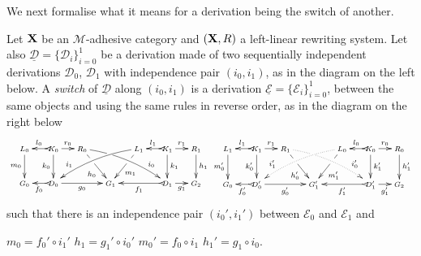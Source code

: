 \documentclass[a4paper,UKenglish,cleveref,pdftex,thm-restate,numberwithinsect]{lipics-v2021}
\def\R{\mathsf{R}}
\def\X{\textbf {\textup{X}}}
\newcommand{\dder}[1]{\mathscr{#1}}
\newcommand{\der}[1]{\underline{\dder{#1}}}
\begin{document}
We next formalise what it means for a derivation being the switch of another.


\begin{definition}[Switch]
  \label{def:switch}
  Let $\X$ be an $\mathcal{M}$-adhesive category 
  and $(\X, \R)$ a left-linear rewriting system. 
  Let also
  $\der{D}=\{\dder{D}_i\}_{i=0}^1$ be a derivation made
  of two sequentially independent derivations $\dder{D}_0$,
  $\dder{D}_1$ with independence pair $(i_0, i_1)$, as in the diagram
  on the left below. A \emph{switch} of $\der{D}$ along $(i_0,i_1)$ is
  a derivation $\der{E}=\{\dder{E}_i\}_{i=0}^1$, between the same objects and using the same rules
  in reverse order, as in the diagram on the right below
  \[
    \def\objectstyle{\scriptstyle}\def\labelstyle{\scriptstyle}
    \xymatrix@C=1.1mm@R=8mm{
      {L_0} \ar[d]_{m_0}
      & & {K_0} \ar@{>->}[ll]_{l_0} \ar[rr]^{r_0} \ar[d]_{k_0}
      & & {R_0} \ar[drr]|(.35)\hole_(.6){h_0}  \ar@/^.22cm/[drrrrrr]|(.3)\hole^(.75){i_0}
      & & & & 
      {L_1}\ar[dll]|(.35)\hole^(.6){m_1} \ar@/_.22cm/_(.75){i_1}[dllllll]
      & & {K_1} \ar@{>->}[ll]_{l_1} \ar[rr]^{r_1} \ar[d]^{k_1}
      & & {R_1} \ar[d]^{h_1} \\
      {G_0}
      & & {D_0} \ar@{>->}[ll]^{f_0} \ar[rrrr]_{g_0}
      & & & & {G_1} & &
      & &  {D_1} \ar@{>->}[llll]^{f_1} \ar[rr]_{g_1}
      & & {G_2}
    }
    \xymatrix@C=1.1mm@R=8mm{
      {L_1} \ar[d]_{m_0'}
      & & {K_1} \ar@{>->}[ll]_{l_1} \ar[rr]^{r_1} \ar[d]_{k_0'}
      & & {R_1} \ar[drr]|(.35)\hole_(.6){h_0'}  \ar@/^.22cm/@{.>}^(.75){i_0'}|(.3)\hole[drrrrrr]
      & & & & 
      {L_0}\ar[dll]|(.35)\hole^(.6){m_1'} \ar@/_.22cm/@{.>}_(.75){i_1'}[dllllll] 
      & & {K_0} \ar@{>->}[ll]_{l_0} \ar[rr]^{r_0} \ar[d]^{k_1'}
      & & {R_0} \ar[d]^{h_1'} \\
      {G_0}
      & & {D_0'} \ar@{>->}[ll]^{f_0'} \ar[rrrr]_{g_0'}
      & & & & {G'_1} & &
      & &  {D_1'} \ar@{>->}[llll]^{f_1'} \ar[rr]_{g_1'}
      & & {G_2}  }
  \]
  such that there is an independence pair $(i_0', i_1')$ between
  $\dder{E}_0$ and $\dder{E}_1$ and 
  \begin{center}   
    $m_0=f_0' \circ i_1'$
    \qquad $h_1=g_1' \circ i_0'$
    \qquad $m_0'= f_0 \circ i_1$
    \qquad $h_1'= g_{1}\circ i_0$.
  \end{center}



\end{definition}
\end{document}
